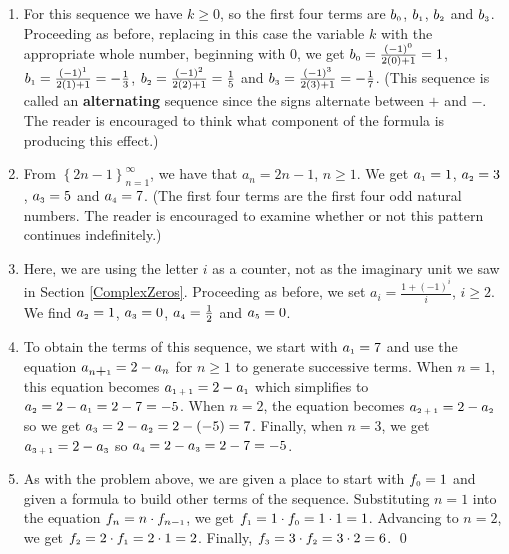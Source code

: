 \begin{ex}
\begin{enumerate}
\item For this sequence we have $k \geq 0$, so the first four terms are $b_{\mbox{\tiny$0$}}$, $b_{\mbox{\tiny$1$}}$, $b_{\mbox{\tiny$2$}}$ and $b_{\mbox{\tiny$3$}}$.  Proceeding as before, replacing in this case the variable $k$ with the appropriate whole number, beginning with $0$, we get $b_{\mbox{\tiny$0$}} = \frac{(-1)^{0}}{2(0)+1} = 1$, $b_{\mbox{\tiny$1$}} = \frac{(-1)^{1}}{2(1)+1} = - \frac{1}{3}$, $b_{\mbox{\tiny$2$}} = \frac{(-1)^{2}}{2(2)+1} = \frac{1}{5}$ and $b_{\mbox{\tiny$3$}} =  \frac{(-1)^{3}}{2(3)+1} = -\frac{1}{7}$.  (This sequence is called an  \textbf{alternating} sequence since the signs alternate between $+$ and $-$. The reader is encouraged to think what component of the formula is producing this effect.)

\item  From $\left\{ 2n - 1 \right\}_{n=1}^{\infty}$, we have that $a_{n} = 2n -1$, $n \geq 1$.  We get $a_{\mbox{\tiny$1$}} = 1$, $a_{\mbox{\tiny$2$}} = 3$, $a_{\mbox{\tiny$3$}} = 5$ and $a_{\mbox{\tiny$4$}} = 7$.  (The first four terms are the first four odd natural numbers.  The reader is encouraged to examine whether or not this pattern continues indefinitely.)

\item  Here, we are using the letter $i$ as a counter, not as the imaginary unit we saw in Section \ref{ComplexZeros}.  Proceeding as before, we set $a_{i} = \frac{1 + (-1)^{i}}{i}$, $i \geq 2$.  We find $a_{\mbox{\tiny$2$}} = 1$, $a_{\mbox{\tiny$3$}} = 0$, $a_{\mbox{\tiny$4$}} = \frac{1}{2}$ and $a_{\mbox{\tiny$5$}} = 0$.  

\item  To obtain the terms of this sequence, we start with $a_{\mbox{\tiny$1$}} = 7$ and use the equation $a_{n \mbox{+\tiny$1$}} = 2 - a_{n}$ for $n \geq 1$ to generate successive terms.  When $n = 1$, this equation becomes $a_{\mbox{\tiny$1 + 1$}} = 2 - a_{\mbox{\tiny$1$}}$ which simplifies to $a_{\mbox{\tiny$2$}} = 2 - a_{\mbox{\tiny$1$}} = 2 - 7 = -5$.  When $n = 2$, the equation becomes $a_{\mbox{\tiny$2 + 1$}} = 2 - a_{\mbox{\tiny$2$}}$ so we get $a_{\mbox{\tiny$3$}} = 2 - a_{\mbox{\tiny$2$}} = 2 - (-5) = 7$.  Finally, when $n = 3$, we get $a_{\mbox{\tiny$3 + 1$}} = 2 - a_{\mbox{\tiny$3$}}$ so $a_{\mbox{\tiny$4$}} = 2 - a_{\mbox{\tiny$3$}} = 2-7 = -5$.  

\item  As with the problem above, we are given a place to start with $f_{\mbox{\tiny$0$}} = 1$ and given a formula to build other terms of the sequence.  Substituting $n = 1$ into the equation $f_{n} = n \cdot f_{n-\mbox{\tiny$1$}}$, we get $f_{\mbox{\tiny$1$}} = 1 \cdot f_{\mbox{\tiny$0$}} = 1 \cdot 1 = 1$.  Advancing to $n = 2$, we get $f_{\mbox{\tiny$2$}} = 2 \cdot f_{\mbox{\tiny$1$}} = 2 \cdot 1 = 2$.  Finally, $f_{\mbox{\tiny$3$}} = 3 \cdot f_{\mbox{\tiny$2$}} = 3 \cdot 2 = 6$.  \qed

\end{enumerate}

\end{ex}

